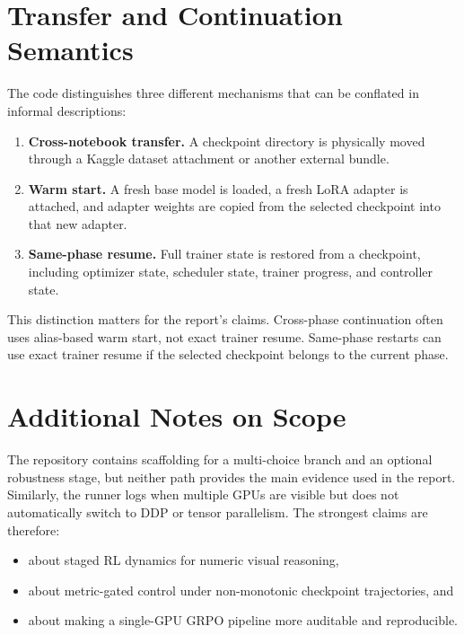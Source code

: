 \documentclass{article} %
\begin{document}
\section{Transfer and Continuation Semantics}

The code distinguishes three different mechanisms that can be conflated in informal descriptions:
\begin{enumerate}[leftmargin=1.2em]
\item \textbf{Cross-notebook transfer.} A checkpoint directory is physically moved through a Kaggle dataset attachment or another external bundle.
\item \textbf{Warm start.} A fresh base model is loaded, a fresh LoRA adapter is attached, and adapter weights are copied from the selected checkpoint into that new adapter.
\item \textbf{Same-phase resume.} Full trainer state is restored from a checkpoint, including optimizer state, scheduler state, trainer progress, and controller state.
\end{enumerate}

This distinction matters for the report's claims. Cross-phase continuation often uses alias-based warm start, not exact trainer resume. Same-phase restarts can use exact trainer resume if the selected checkpoint belongs to the current phase.

\section{Additional Notes on Scope}

The repository contains scaffolding for a multi-choice branch and an optional robustness stage, but neither path provides the main evidence used in the report. Similarly, the runner logs when multiple GPUs are visible but does not automatically switch to DDP or tensor parallelism. The strongest claims are therefore:
\begin{itemize}[leftmargin=1.2em]
\item about staged RL dynamics for numeric visual reasoning,
\item about metric-gated control under non-monotonic checkpoint trajectories, and
\item about making a single-GPU GRPO pipeline more auditable and reproducible.
\end{itemize}
\end{document}
